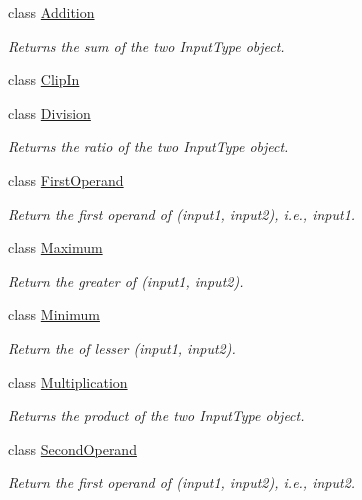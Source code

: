 \begin{DoxyCompactItemize}
\item 
class \hyperlink{classvct_store_back_binary_operations_1_1_addition}{Addition}
\begin{DoxyCompactList}\small\item\em Returns the sum of the two Input\-Type object. \end{DoxyCompactList}\item 
class \hyperlink{classvct_store_back_binary_operations_1_1_clip_in}{Clip\-In}
\item 
class \hyperlink{classvct_store_back_binary_operations_1_1_division}{Division}
\begin{DoxyCompactList}\small\item\em Returns the ratio of the two Input\-Type object. \end{DoxyCompactList}\item 
class \hyperlink{classvct_store_back_binary_operations_1_1_first_operand}{First\-Operand}
\begin{DoxyCompactList}\small\item\em Return the first operand of (input1, input2), i.\-e., input1. \end{DoxyCompactList}\item 
class \hyperlink{classvct_store_back_binary_operations_1_1_maximum}{Maximum}
\begin{DoxyCompactList}\small\item\em Return the greater of (input1, input2). \end{DoxyCompactList}\item 
class \hyperlink{classvct_store_back_binary_operations_1_1_minimum}{Minimum}
\begin{DoxyCompactList}\small\item\em Return the of lesser (input1, input2). \end{DoxyCompactList}\item 
class \hyperlink{classvct_store_back_binary_operations_1_1_multiplication}{Multiplication}
\begin{DoxyCompactList}\small\item\em Returns the product of the two Input\-Type object. \end{DoxyCompactList}\item 
class \hyperlink{classvct_store_back_binary_operations_1_1_second_operand}{Second\-Operand}
\begin{DoxyCompactList}\small\item\em Return the first operand of (input1, input2), i.\-e., input2. \end{DoxyCompactList}\item 

\end{DoxyCompactItemize}
